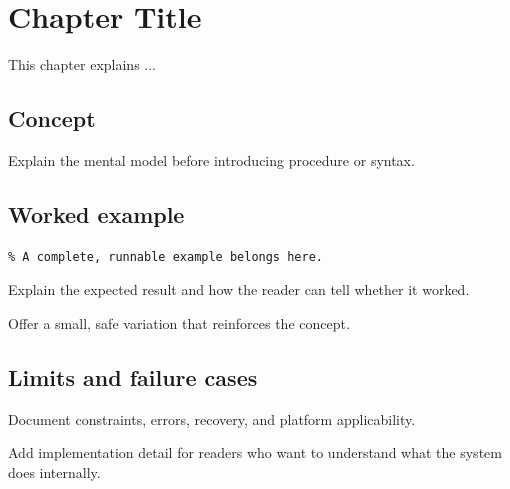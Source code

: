 \chapter{Chapter Title}
\label{ch:short-stable-label}

This chapter explains ...

\section{Concept}
Explain the mental model before introducing procedure or syntax.

\section{Worked example}
\begin{lstlisting}
% A complete, runnable example belongs here.
\end{lstlisting}

Explain the expected result and how the reader can tell whether it worked.

\begin{trythis}
Offer a small, safe variation that reinforces the concept.
\end{trythis}

\section{Limits and failure cases}
Document constraints, errors, recovery, and platform applicability.

\begin{underhood}
Add implementation detail for readers who want to understand what the system does internally.
\end{underhood}

